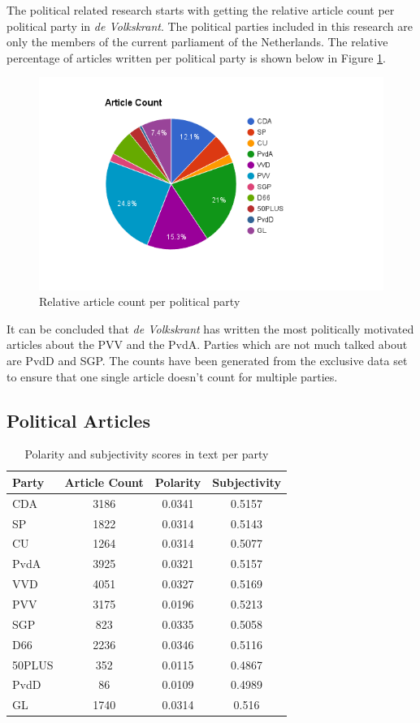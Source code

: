 The political related research starts with getting the relative article count per political party in {\it de Volkskrant}. The political parties included in this research are only the members of the current parliament of the Netherlands. The relative percentage of articles written per political party is shown below in Figure \ref{fig:article_count_exclusive}. \\
    \begin{figure}[ht]
        \centering
        \includegraphics[scale=0.43]{Graphs/article_count_exclusive}
        \caption{Relative article count per political party}
        \label{fig:article_count_exclusive}
    \end{figure}
It can be concluded that {\it de Volkskrant} has written the most politically motivated articles about the PVV and the PvdA. Parties which are not much talked about are PvdD and SGP. The counts have been generated from the exclusive data set to ensure that one single article doesn't count for multiple parties. \\
\subsection{Political Articles}
\begin{table}[h]
  \begin{tabular}{ l | c | c | c }
  Party&Article Count&Polarity&Subjectivity\\
  \hline
CDA&3186&0.0341&0.5157 \\
SP&1822&0.0314&0.5143 \\
CU&1264&0.0314&0.5077 \\
PvdA&3925&0.0321&0.5157 \\
VVD&4051&0.0327&0.5169 \\
PVV&3175&0.0196&0.5213 \\
SGP&823&0.0335&0.5058 \\
D66&2236&0.0346&0.5116 \\
50PLUS&352&0.0115&0.4867 \\
PvdD&86&0.0109&0.4989 \\
GL&1740&0.0314&0.516
  \end{tabular}
  \caption{Polarity and subjectivity scores in text per party}
  \label{tab:party_scores}
\end{table}

